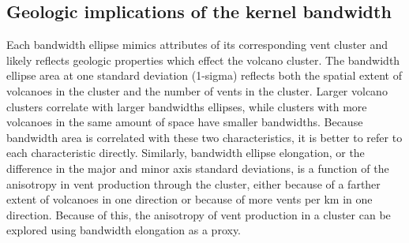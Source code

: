 





\subsection{Geologic implications of the kernel bandwidth}
Each bandwidth ellipse mimics attributes of its corresponding vent cluster and likely reflects geologic properties which effect the volcano cluster. The bandwidth ellipse area at one standard deviation (1-sigma) reflects both the spatial extent of volcanoes in the cluster and the number of vents in the cluster. Larger volcano clusters correlate with larger bandwidths ellipses, while clusters with more volcanoes in the same amount of space have smaller bandwidths. Because bandwidth area is correlated with these two characteristics, it is better to refer to each characteristic directly. Similarly, bandwidth ellipse elongation, or the difference in the major and minor axis standard deviations, is a function of the anisotropy in vent production through the cluster, either because of a farther extent of volcanoes in one direction or because of more vents per km in one direction. Because of this, the anisotropy of vent production in a cluster can be explored using bandwidth elongation as a proxy.

